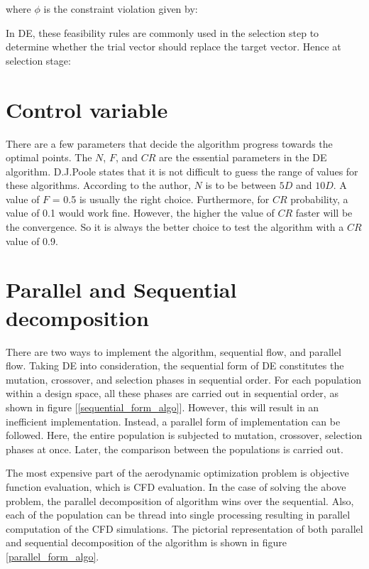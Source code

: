 where $\phi$ is the constraint violation given by:


In DE, these feasibility rules are commonly used in the selection step to determine whether the trial vector should
replace the target vector. Hence at selection stage:


\section{Control variable}

There are a few parameters that decide the algorithm progress towards the optimal points. The $N$, $F$, and $CR$ are the essential parameters in the DE algorithm. D.J.Poole \cite{storn} states that it is not difficult to guess the range of values for these algorithms. According to the author, $N$ is to be between $5D$ and $10D$. A value of $F$ = 0.5 is usually the right choice. Furthermore, for $CR$ probability, a value of 0.1 would work fine. However, the higher the value of $CR$ faster will be the convergence. So it is always the better choice to test the algorithm with a $CR$ value of 0.9.

\section{Parallel and Sequential decomposition}
There are two ways to implement the algorithm, sequential flow, and parallel flow. Taking DE into consideration, the sequential form of DE constitutes the mutation, crossover, and selection phases in sequential order. For each population within a design space, all these phases are carried out in sequential order, as shown in figure [\ref{sequential_form_algo}]. However, this will result in an inefficient implementation. Instead, a parallel form of implementation can be followed. Here, the entire population is subjected to mutation, crossover, selection phases at once. Later, the comparison between the populations is carried out. 

The most expensive part of the aerodynamic optimization problem is objective function evaluation, which is CFD evaluation. In the case of solving the above problem, the parallel decomposition of algorithm wins over the sequential. Also, each of the population can be thread into single processing resulting in parallel computation of the CFD simulations. The pictorial representation of both parallel and sequential decomposition of the algorithm is shown in figure \ref{parallel_form_algo}.

